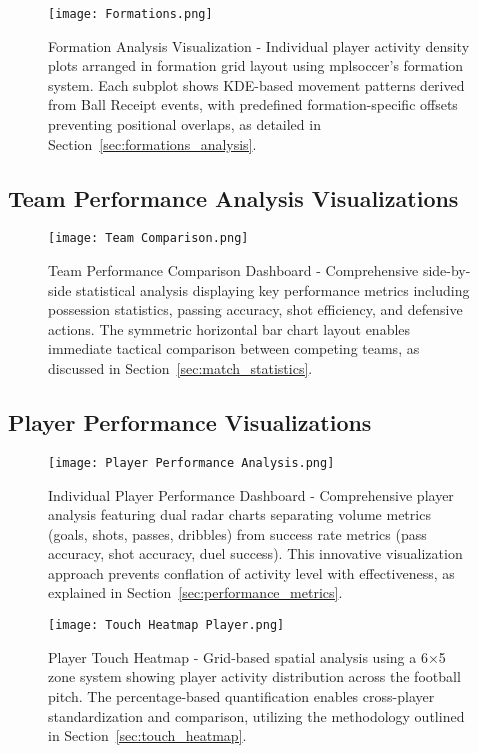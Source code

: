 \documentclass[12pt,a4paper]{article}
\begin{document}
\begin{figure}[H]
    \centering
    \texttt{[image: Formations.png]}
    \caption{Formation Analysis Visualization - Individual player activity density plots arranged in formation grid layout using mplsoccer's formation system. Each subplot shows KDE-based movement patterns derived from Ball Receipt events, with predefined formation-specific offsets preventing positional overlaps, as detailed in Section~\ref{sec:formations_analysis}.}
    \label{fig:formations}
\end{figure}

\subsection{Team Performance Analysis Visualizations}
\begin{figure}[H]
    \centering
    \texttt{[image: Team Comparison.png]}
    \caption{Team Performance Comparison Dashboard - Comprehensive side-by-side statistical analysis displaying key performance metrics including possession statistics, passing accuracy, shot efficiency, and defensive actions. The symmetric horizontal bar chart layout enables immediate tactical comparison between competing teams, as discussed in Section~\ref{sec:match_statistics}.}
    \label{fig:team_comparison}
\end{figure}
\subsection{Player Performance Visualizations}

\begin{figure}[H]
    \centering
    \texttt{[image: Player Performance Analysis.png]}
    \caption{Individual Player Performance Dashboard - Comprehensive player analysis featuring dual radar charts separating volume metrics (goals, shots, passes, dribbles) from success rate metrics (pass accuracy, shot accuracy, duel success). This innovative visualization approach prevents conflation of activity level with effectiveness, as explained in Section~\ref{sec:performance_metrics}.}
    \label{fig:player_performance}
\end{figure}

\begin{figure}[H]
    \centering
    \texttt{[image: Touch Heatmap Player.png]}
    \caption{Player Touch Heatmap - Grid-based spatial analysis using a 6×5 zone system showing player activity distribution across the football pitch. The percentage-based quantification enables cross-player standardization and comparison, utilizing the methodology outlined in Section~\ref{sec:touch_heatmap}.}
    \label{fig:touch_heatmap}
\end{figure}
\end{document}
